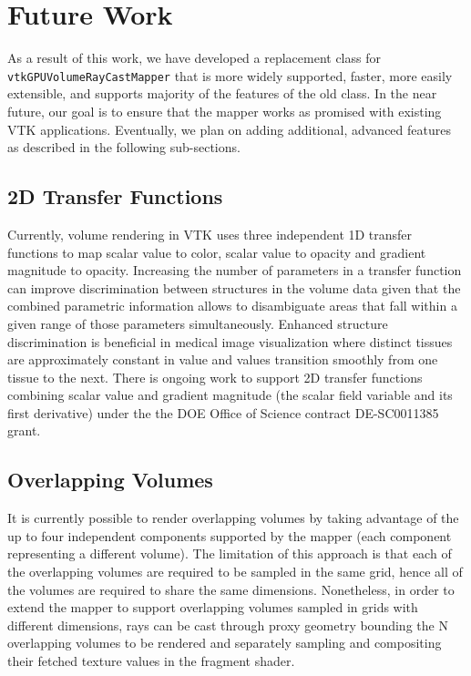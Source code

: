 \section{Future Work}
\label{future-work}
As a result of this work, we have developed a replacement class for
\texttt{vtkGPUVolumeRayCastMapper} that is more widely supported, faster, more
easily extensible, and supports majority of the features of the old class. In
the near future, our goal is to ensure that the mapper works as promised with
existing VTK applications. Eventually, we plan on adding additional, advanced
features as described in the following sub-sections.

\subsection{2D Transfer Functions}
\label{2d-transfer-functions}
Currently, volume rendering in VTK uses three independent 1D transfer functions
to map scalar value to color, scalar value to opacity and gradient magnitude to
opacity. Increasing the number of parameters in a transfer function can improve
discrimination between structures in the volume data given that the combined
parametric information allows to disambiguate areas that fall within a given
range of those parameters simultaneously. Enhanced structure discrimination is
beneficial in medical image visualization where distinct tissues are
approximately constant in value and values transition smoothly from one tissue
to the next. There is ongoing work to support 2D transfer functions combining
scalar value and gradient magnitude (the scalar field variable and its first
derivative) under the the DOE Office of Science contract DE-SC0011385 grant.

\subsection{Overlapping Volumes}
\label{overlapping-volumes}
It is currently possible to render overlapping volumes by taking advantage of
the up to four independent components supported by the mapper (each component
representing a different volume).
The limitation of this approach is that each of the overlapping volumes are
required to be sampled in the same grid, hence all of the volumes are required
to share the same dimensions.  Nonetheless, in order to extend the mapper to
support overlapping volumes sampled in grids with different dimensions, rays
can be cast through proxy geometry bounding the N overlapping volumes to be
rendered and separately sampling and compositing their fetched texture values in
the fragment shader.

